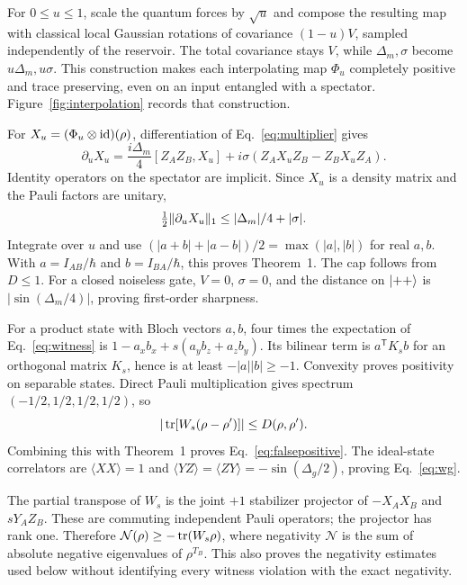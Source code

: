 For $0\le u\le1$, scale the quantum forces by $\sqrt u$ and compose the resulting map with classical local Gaussian rotations of covariance $(1-u)V$, sampled independently of the reservoir. The total covariance stays $V$, while $\Delta_m,\sigma$ become $u\Delta_m,u\sigma$. This construction makes each interpolating map $\Phi_u$ completely positive and trace preserving, even on an input entangled with a spectator. Figure~\ref{fig:interpolation} records that construction.

For $X_u=(\Phi_u\otimes\operatorname{id})(\rho)$, differentiation of Eq.~\eqref{eq:multiplier} gives
\begin{equation}
\partial_uX_u=\frac{i\Delta_m}4[Z_AZ_B,X_u]
+i\sigma(Z_AX_uZ_B-Z_BX_uZ_A).
\label{eq:derivative}
\end{equation}
Identity operators on the spectator are implicit. Since $X_u$ is a density matrix and the Pauli factors are unitary,
\begin{equation}
\tfrac12\norm{\partial_uX_u}_1\le |\Delta_m|/4+|\sigma|.
\label{eq:derivativebound}
\end{equation}
Integrate over $u$ and use $(|a+b|+|a-b|)/2=\max(|a|,|b|)$ for real $a,b$. With $a=I_{AB}/\hbar$ and $b=I_{BA}/\hbar$, this proves Theorem~1. The cap follows from $D\le1$. For a closed noiseless gate, $V=0$, $\sigma=0$, and the distance on $\lvert++\rangle$ is $|\sin(\Delta_m/4)|$, proving first-order sharpness.

For a product state with Bloch vectors $a,b$, four times the expectation of Eq.~\eqref{eq:witness} is $1-a_xb_x+s(a_yb_z+a_zb_y)$. Its bilinear term is $a^{\mathsf T}K_sb$ for an orthogonal matrix $K_s$, hence is at least $-|a||b|\ge-1$. Convexity proves positivity on separable states. Direct Pauli multiplication gives spectrum $(-1/2,1/2,1/2,1/2)$, so
\begin{equation}
|\tr[W_s(\rho-\rho')]|\le D(\rho,\rho').
\label{eq:witnesslipschitz}
\end{equation}
Combining this with Theorem~1 proves Eq.~\eqref{eq:falsepositive}. The ideal-state correlators are $\langle XX\rangle=1$ and $\langle YZ\rangle=\langle ZY\rangle=-\sin(\Delta_g/2)$, proving Eq.~\eqref{eq:wg}.

The partial transpose of $W_s$ is the joint $+1$ stabilizer projector of $-X_AX_B$ and $sY_AZ_B$. These are commuting independent Pauli operators; the projector has rank one. Therefore $\mathcal N(\rho)\ge-\operatorname{tr}(W_s\rho)$, where negativity $\mathcal N$ is the sum of absolute negative eigenvalues of $\rho^{T_B}$. This also proves the negativity estimates used below without identifying every witness violation with the exact negativity.

